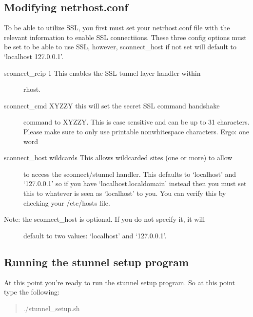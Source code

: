 \documentclass[letterpaper,10pt,english]{sphinxmanual}
\begin{document}
\subsection{Modifying netrhost.conf}
\label{\detokenize{14-ssl:modifying-netrhost-conf}}
\sphinxAtStartPar
To be able to utilize SSL, you first must set your netrhost.conf file with
the relevant information to enable SSL connectiions.  These three config
options must be set to be able to use SSL, however, sconnect\_host if
not set will default to ‘localhost 127.0.0.1’.
\begin{description}
\item[{sconnect\_reip 1         \textendash{} This enables the SSL tunnel layer handler within}] \leavevmode
\sphinxAtStartPar
rhost.

\item[{sconnect\_cmd XYZZY      \textendash{} this will set the secret SSL command handshake}] \leavevmode
\sphinxAtStartPar
command to XYZZY.  This is case sensitive and can
be up to 31 characters.  Please make sure to only
use printable non\sphinxhyphen{}whitespace characters.
Ergo: one word

\item[{sconnect\_host wildcards \textendash{} This allows wildcarded sites (one or more) to allow}] \leavevmode
\sphinxAtStartPar
to access the sconnect/stunnel handler.  This
defaults to ‘localhost’ and ‘127.0.0.1’ so if you
have ‘localhost.localdomain’ instead then you must
set this to whatever is seen as ‘localhost’ to you.
You can verify this by checking your /etc/hosts
file.

\item[{Note: the sconnect\_host is optional.  If you do not specify it, it will}] \leavevmode
\sphinxAtStartPar
default to two values:  ‘localhost’ and ‘127.0.0.1’.

\end{description}


\subsection{Running the stunnel setup program}
\label{\detokenize{14-ssl:running-the-stunnel-setup-program}}
\sphinxAtStartPar
At this point you’re ready to run the stunnel setup program.  So at this point
type the following:
\begin{quote}

\sphinxAtStartPar
./stunnel\_setup.sh
\end{quote}
\end{document}
